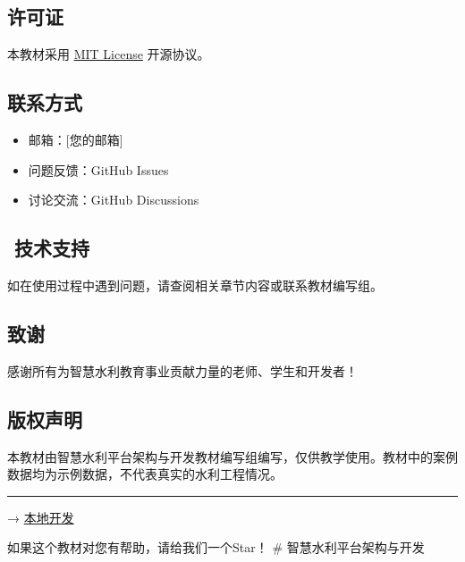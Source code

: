 \hypertarget{ux8bb8ux53efux8bc1}{%
\subsection{许可证}\label{ux8bb8ux53efux8bc1}}

本教材采用 \href{LICENSE}{MIT License} 开源协议。

\hypertarget{ux8054ux7cfbux65b9ux5f0f}{%
\subsection{联系方式}\label{ux8054ux7cfbux65b9ux5f0f}}

\begin{itemize}
\tightlist
\item
  邮箱：{[}您的邮箱{]}
\item
  问题反馈：GitHub Issues
\item
  讨论交流：GitHub Discussions
\end{itemize}

\hypertarget{ux6280ux672fux652fux6301}{%
\subsection{\texorpdfstring{️ 技术支持}{️ 技术支持}}\label{ux6280ux672fux652fux6301}}

如在使用过程中遇到问题，请查阅相关章节内容或联系教材编写组。

\hypertarget{ux81f4ux8c22}{%
\subsection{致谢}\label{ux81f4ux8c22}}

感谢所有为智慧水利教育事业贡献力量的老师、学生和开发者！

\hypertarget{ux7248ux6743ux58f0ux660e}{%
\subsection{版权声明}\label{ux7248ux6743ux58f0ux660e}}

本教材由智慧水利平台架构与开发教材编写组编写，仅供教学使用。教材中的案例数据均为示例数据，不代表真实的水利工程情况。

\begin{center}\rule{0.5\linewidth}{0.5pt}\end{center}

 → \protect\hyperlink{ux672cux5730ux5f00ux53d1}{本地开发}

如果这个教材对您有帮助，请给我们一个Star！ \# 智慧水利平台架构与开发

